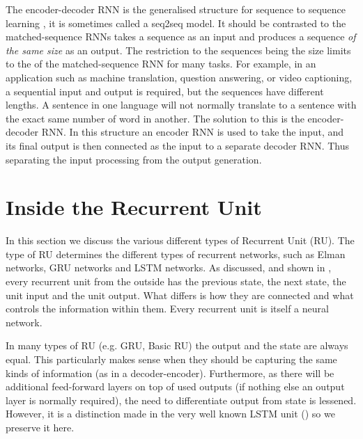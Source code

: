 \documentclass[12pt,parskip]{komatufte}
\begin{document}
The encoder-decoder RNN is the generalised structure for sequence to sequence learning , it is sometimes called a seq2seq model.
It should be contrasted to the matched-sequence RNNs takes a sequence as an input and produces a sequence \emph{of the same size} as an output.
The restriction to the sequences being the size limits to the of the matched-sequence RNN for many tasks.
For example, in an application such as machine translation, question answering, or video captioning, a sequential input and output is required, but the sequences have different lengths.
A sentence in one language will not normally translate to a sentence with the exact same number of word in another.
The solution to this is the encoder-decoder RNN.
In this structure an encoder RNN is used to take the input, and its final output is then connected as the input to a separate decoder RNN.
Thus separating the input processing from the output generation.




\section{Inside the Recurrent Unit}
In this section we discuss the various different types of Recurrent Unit (RU).
The type of RU determines the different types of recurrent networks, such as Elman networks, GRU networks and LSTM networks.
As discussed, and shown in , every recurrent unit from the outside has the previous state, the next state, the unit input and the unit output.
What differs is how they are connected and what controls the information within them.
Every recurrent unit is itself a neural network.

In many types of RU (e.g. GRU, Basic RU) the output and the state are always equal.
This particularly makes sense when they should be capturing the same kinds of information (as in a decoder-encoder).
Furthermore, as there will be additional feed-forward layers on top of used outputs (if nothing else an output layer is normally required), the need to differentiate output from state is lessened.
However, it is a distinction made in the very well known LSTM unit () so we preserve it here.
\end{document}

